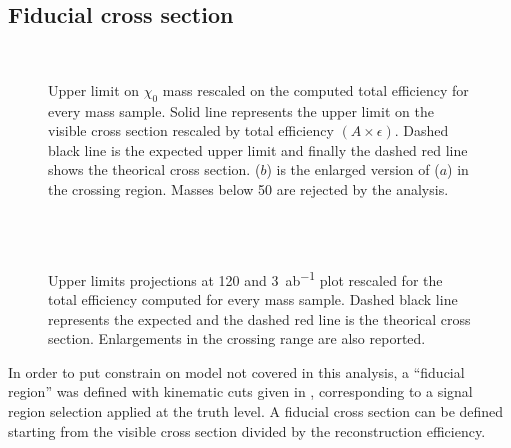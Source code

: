 

\subsection{Fiducial cross section}
\label{sec:fid}



\begin{figure}[p]
\centering
{} \\
 \quad
\caption{Upper limit on $\chi_0$ mass rescaled on the computed total efficiency for every mass sample. Solid line represents the upper limit on the visible cross section rescaled by total efficiency $\left(A\times\epsilon\right)$. Dashed black line is the expected upper limit and finally the dashed red line shows the theorical cross section. ($b$) is the enlarged version of ($a$) in the crossing region. Masses below \SI{50}{\gev} are rejected by the analysis.}
\label{fig:exclMI}
\end{figure}

\begin{figure}[p]
\centering
{} \quad
{} \\
 \quad
{} \\
\caption{Upper limits projections at \SI{120}{\ifb} and \SI{3}{ab^{-1}} plot rescaled for the total efficiency computed for every mass sample. Dashed black line represents the expected and the dashed red line is the theorical cross section. Enlargements in the crossing range are also reported.}
\label{fig:outlookmi}
\end{figure}

In order to put constrain on model not covered in this analysis, a ``fiducial region'' was defined with kinematic cuts given in \Sect{\ref{sec:truth}}, corresponding to a signal region selection applied at the truth level. A fiducial cross section can be defined starting from the visible cross section divided by the reconstruction efficiency.

